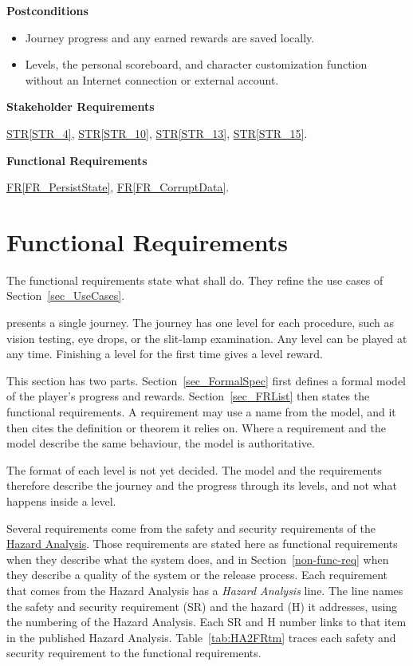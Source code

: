 \documentclass[10pt]{article}
\newcommand{\strref}[1]{\hyperref[#1]{STR\ref*{#1}}}
\newcommand{\rref}[1]{\hyperref[#1]{FR\ref*{#1}}}
\newcommand{\haurl}{https://team-hindsight.github.io/ophthamology-game/HazardAnalysis/HazardAnalysis.pdf}
\newcommand{\hadoc}[1]{\href{\haurl}{#1}}
\begin{document}
\textbf{Postconditions}
\begin{itemize}
    \item Journey progress and any earned rewards are saved locally.
    \item Levels, the personal scoreboard, and character customization
    function without an Internet connection or external account.
\end{itemize}

\textbf{Stakeholder Requirements}

\strref{STR_4}, \strref{STR_10}, \strref{STR_13}, \strref{STR_15}.

\textbf{Functional Requirements}

\rref{FR_PersistState}, \rref{FR_CorruptData}.

\newpage
\section{Functional Requirements}
\label{sec_FR}

The functional requirements state what \progname{} shall do. They refine the
use cases of Section~\ref{sec_UseCases}.

\progname{} presents a single journey. The journey has one level for each
procedure, such as vision testing, eye drops, or the slit-lamp examination.
Any level can be played at any time. Finishing a level for the first time gives
a level reward.

This section has two parts. Section~\ref{sec_FormalSpec} first defines a
formal model of the player's progress and rewards.
Section~\ref{sec_FRList} then states the functional requirements. A
requirement may use a name from the model, and it then cites the definition or
theorem it relies on. Where a requirement and the model describe the same
behaviour, the model is authoritative.

The format of each level is not yet decided. The model and the requirements
therefore describe the journey and the progress through its levels, and not
what happens inside a level.

Several requirements come from the safety and security requirements of the
\hadoc{Hazard Analysis}. Those requirements are stated here as functional requirements
when they describe what the system does, and in
Section~\ref{non-func-req} when they describe a quality of the system or the
release process. Each requirement that comes from the Hazard Analysis has a
\textit{Hazard Analysis} line. The line names the safety and security
requirement (SR) and the hazard (H) it addresses, using the numbering of the
Hazard Analysis. Each SR and H number links to that item in the published
Hazard Analysis. Table~\ref{tab:HA2FRtm} traces each safety and security
requirement to the functional requirements.
\end{document}
